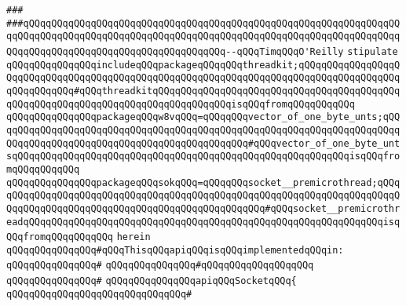 \verb|###|\newline
\verb|###qQQqqQQqqQQqqQQqqQQqqQQqqQQqqQQqqQQqqQQqqQQqqQQqqQQqqQQqqQQqqQQqqQQqqQQqqQQqqQQqqQQqqQQqqQQqqQQqqQQqqQQqqQQqqQQqqQQqqQQqqQQqqQQqqQQqqQQqqQQqqQQqqQQqqQQqqQQqqQQqqQQqqQQqqQQqqQQq--qQQqTimqQQqO'Reilly|\newline
\newline
\newline
\newline
\verb|stipulate|\newline
\verb|qQQqqQQqqQQqqQQqincludeqQQqpackageqQQqqQQqthreadkit;qQQqqQQqqQQqqQQqqQQqqQQqqQQqqQQqqQQqqQQqqQQqqQQqqQQqqQQqqQQqqQQqqQQqqQQqqQQqqQQqqQQqqQQqqQQqqQQqqQQq#qQQqthreadkitqQQqqQQqqQQqqQQqqQQqqQQqqQQqqQQqqQQqqQQqqQQqqQQqqQQqqQQqqQQqqQQqqQQqqQQqqQQqqQQqqQQqisqQQqfromqQQqqQQqqQQq|\newline
\newline
\verb|qQQqqQQqqQQqqQQqpackageqQQqw8vqQQq=qQQqqQQqvector_of_one_byte_unts;qQQqqQQqqQQqqQQqqQQqqQQqqQQqqQQqqQQqqQQqqQQqqQQqqQQqqQQqqQQqqQQqqQQqqQQqqQQqqQQqqQQqqQQqqQQqqQQqqQQqqQQqqQQqqQQqqQQq#qQQqvector_of_one_byte_untsqQQqqQQqqQQqqQQqqQQqqQQqqQQqqQQqqQQqqQQqqQQqqQQqqQQqqQQqqQQqisqQQqfromqQQqqQQqqQQq|\newline
\verb|qQQqqQQqqQQqqQQqpackageqQQqsokqQQq=qQQqqQQqsocket__premicrothread;qQQqqQQqqQQqqQQqqQQqqQQqqQQqqQQqqQQqqQQqqQQqqQQqqQQqqQQqqQQqqQQqqQQqqQQqqQQqqQQqqQQqqQQqqQQqqQQqqQQqqQQqqQQqqQQqqQQqqQQq#qQQqsocket__premicrothreadqQQqqQQqqQQqqQQqqQQqqQQqqQQqqQQqqQQqqQQqqQQqqQQqqQQqqQQqqQQqqQQqisqQQqfromqQQqqQQqqQQq|\newline
\verb|herein|\newline
\newline
\verb|qQQqqQQqqQQqqQQq#qQQqThisqQQqapiqQQqisqQQqimplementedqQQqin:|\newline
\verb|qQQqqQQqqQQqqQQq#|\newline
\verb|qQQqqQQqqQQqqQQq#qQQqqQQqqQQqqQQqqQQq|\newline
\verb|qQQqqQQqqQQqqQQq#|\newline
\verb|qQQqqQQqqQQqqQQqapiqQQqSocketqQQq{|\newline
\verb|qQQqqQQqqQQqqQQqqQQqqQQqqQQqqQQq#|\newline
